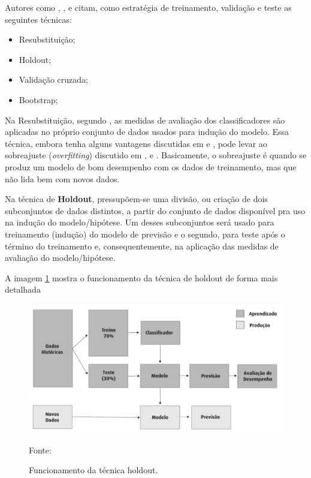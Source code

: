 Autores como \cite{Boscarioli2017}, \cite{aprenda_mineracao_fernando_amaral16}, \cite{data_science_do_zero2016} e\cite{ferrari2017} citam, como estratégia de treinamento, validação e teste as seguintes técnicas:
\begin{itemize}
	\item Resubstituição;
	\item Holdout;
	\item Validação cruzada;
	\item Bootstrap;
\end{itemize}

Na Resubstituição, segundo \cite{Boscarioli2017}, as medidas de avaliação dos classificadores são aplicadas no próprio conjunto de dados usados para indução do modelo. Essa técnica, embora tenha alguns vantagens discutidas em \cite{ferrari2017} e \cite{Boscarioli2017}, pode levar ao sobreajuste (\textit{overfitting}) discutido em \cite{data_science_do_zero2016}, \cite{aprenda_mineracao_fernando_amaral16} e \cite{Norvig2013}. Basicamente, o sobreajuste é quando se produz um modelo de bom desempenho com os dados de treinamento, mas que não lida bem com novos dados.

Na técnica de \textbf{Holdout}, pressupõem-se uma divisão, ou criação de dois subconjuntos de dados distintos, a partir do conjunto de dados disponível pra uso na indução do modelo/hipótese. Um desses subconjuntos será usado para treinamento (indução) do modelo de previsão e o segundo, para teste após o término do treinamento e, consequentemente, na aplicação das medidas de avaliação do modelo/hipótese.\cite{Boscarioli2017}

A imagem \ref{fig:img_holdout} mostra o funcionamento da técnica de holdout de forma mais detalhada
\begin{figure}[h!]
	\centering
	\includegraphics[width=.6\textwidth]{imagens/hold_out.png}
	\caption{Funcionamento da técnica holdout.}
	{\scriptsize Fonte:\cite{aprenda_mineracao_fernando_amaral16}}
	\label{fig:img_holdout}
\end{figure}

